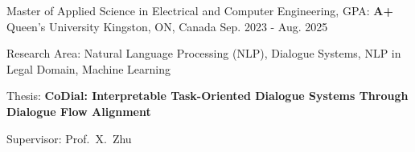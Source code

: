 

\begin{cventries}

  \cventry
    {Master of Applied Science in Electrical and Computer Engineering, GPA: \textbf{A+}} %
    {Queen's University} %
    {Kingston, ON, Canada} %
    {Sep. 2023 - Aug. 2025} %
    {
      \begin{cvitems}
        \item{
          Research Area: Natural Language Processing (NLP), Dialogue Systems, NLP in Legal Domain, Machine Learning
        }
        \item{Thesis: \textbf{CoDial: Interpretable Task-Oriented Dialogue Systems Through Dialogue Flow Alignment}}
        \item{
          Supervisor: Prof.~X.~Zhu
        }
      \end{cvitems}
    }


\end{cventries}
